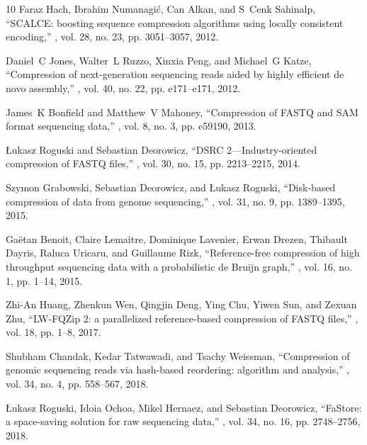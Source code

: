 \documentclass[smallabstract,smallcaptions]{dccpaper}
\begin{document}
\begin{thebibliography}{10}
Faraz Hach, Ibrahim Numanagi{\'c}, Can Alkan, and S~Cenk Sahinalp,
\newblock ``{SCALCE: boosting sequence compression algorithms using locally
  consistent encoding},''
, vol. 28, no. 23, pp. 3051--3057, 2012.

Daniel~C Jones, Walter~L Ruzzo, Xinxia Peng, and Michael~G Katze,
\newblock ``{Compression of next-generation sequencing reads aided by highly
  efficient de novo assembly},''
, vol. 40, no. 22, pp. e171--e171, 2012.

James~K Bonfield and Matthew~V Mahoney,
\newblock ``{Compression of FASTQ and SAM format sequencing data},''
, vol. 8, no. 3, pp. e59190, 2013.

{\L}ukasz Roguski and Sebastian Deorowicz,
\newblock ``{DSRC 2—Industry-oriented compression of FASTQ files},''
, vol. 30, no. 15, pp. 2213--2215, 2014.

Szymon Grabowski, Sebastian Deorowicz, and {\L}ukasz Roguski,
\newblock ``{Disk-based compression of data from genome sequencing},''
, vol. 31, no. 9, pp. 1389--1395, 2015.

Ga{\"e}tan Benoit, Claire Lemaitre, Dominique Lavenier, Erwan Drezen, Thibault
  Dayris, Raluca Uricaru, and Guillaume Rizk,
\newblock ``{Reference-free compression of high throughput sequencing data with
  a probabilistic de Bruijn graph},''
, vol. 16, no. 1, pp. 1--14, 2015.

Zhi-An Huang, Zhenkun Wen, Qingjin Deng, Ying Chu, Yiwen Sun, and Zexuan Zhu,
\newblock ``{LW-FQZip 2: a parallelized reference-based compression of FASTQ
  files},''
, vol. 18, pp. 1--8, 2017.

Shubham Chandak, Kedar Tatwawadi, and Tsachy Weissman,
\newblock ``{Compression of genomic sequencing reads via hash-based reordering:
  algorithm and analysis},''
, vol. 34, no. 4, pp. 558--567, 2018.

{\L}ukasz Roguski, Idoia Ochoa, Mikel Hernaez, and Sebastian Deorowicz,
\newblock ``{FaStore: a space-saving solution for raw sequencing data},''
, vol. 34, no. 16, pp. 2748--2756, 2018.


\end{thebibliography}
\end{document}
